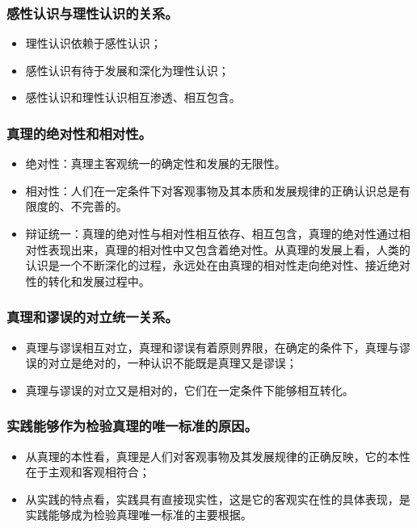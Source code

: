 \documentclass{article}
\begin{document}
\subsubsection{感性认识与理性认识的关系。}
\begin{itemize}
    \item 理性认识依赖于感性认识；
    \item 感性认识有待于发展和深化为理性认识；
    \item 感性认识和理性认识相互渗透、相互包含。
\end{itemize}

\subsubsection{真理的绝对性和相对性。}
\begin{itemize}
    \item 绝对性：真理主客观统一的确定性和发展的无限性。
    \item 相对性：人们在一定条件下对客观事物及其本质和发展规律的正确认识总是有限度的、不完善的。
    \item 辩证统一：真理的绝对性与相对性相互依存、相互包含，真理的绝对性通过相对性表现出来，真理的相对性中又包含着绝对性。从真理的发展上看，人类的认识是一个不断深化的过程，永远处在由真理的相对性走向绝对性、接近绝对性的转化和发展过程中。
\end{itemize}

\subsubsection{真理和谬误的对立统一关系。}
\begin{itemize}
    \item 真理与谬误相互对立，真理和谬误有着原则界限，在确定的条件下，真理与谬误的对立是绝对的，一种认识不能既是真理又是谬误；
    \item 真理与谬误的对立又是相对的，它们在一定条件下能够相互转化。
\end{itemize}

\subsubsection{实践能够作为检验真理的唯一标准的原因。}
\begin{itemize}
    \item 从真理的本性看，真理是人们对客观事物及其发展规律的正确反映，它的本性在于主观和客观相符合；
    \item 从实践的特点看，实践具有直接现实性，这是它的客观实在性的具体表现，是实践能够成为检验真理唯一标准的主要根据。
\end{itemize}
\end{document}
